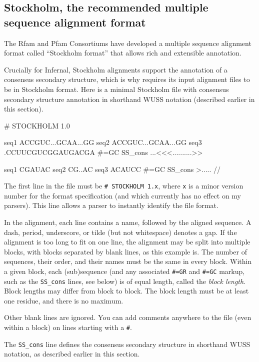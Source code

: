\subsection{Stockholm, the recommended multiple sequence alignment format}

The Rfam and Pfam Consortiums have developed a multiple sequence
alignment format called ``Stockholm format'' that allows rich and
extensible annotation. 

Crucially for Infernal, Stockholm alignments support the annotation of 
a consensus secondary structure, which is why  requires
its input alignment files to be in Stockholm format. Here is a minimal
Stockholm file with consensus secondary structure annotation in
shorthand WUSS notation (described earlier in this section).

\begin{sreoutput}
# STOCKHOLM 1.0

seq1           ACCGUC...GCAA...GG
seq2           ACCGUC...GCAA...GG
seq3           .CCUUCGUCGGAUGACGA
#=GC SS_cons   ...<<<..........>>

seq1           CGAUAC
seq2           CG..AC
seq3           ACAUCC
#=GC SS_cons   >.....
//
\end{sreoutput}

The first line in the file must be \verb+# STOCKHOLM 1.x+, where
\verb+x+ is a minor version number for the format specification
(and which currently has no effect on my parsers). This line allows a
parser to instantly identify the file format.

In the alignment, each line contains a name, followed by the aligned
sequence. A dash, period, underscore, or tilde (but not whitespace)
denotes a gap. If the alignment is too long to fit on one line, the
alignment may be split into multiple blocks, with blocks separated by
blank lines, as this example is. The number of sequences, their order,
and their names must be the same in every block. Within a given block,
each (sub)sequence (and any associated \verb+#=GR+ and \verb+#=GC+
markup, such as the \verb+SS_cons+ lines, see below) is of equal
length, called the \textit{block length}. Block lengths may differ
from block to block. The block length must be at least one residue,
and there is no maximum. 

Other blank lines are ignored. You can add comments anywhere to the
file (even within a block) on lines starting with a \verb+#+.

The \verb+SS_cons+ line defines the consensus secondary structure in
shorthand WUSS notation, as described earlier in 
this section.


